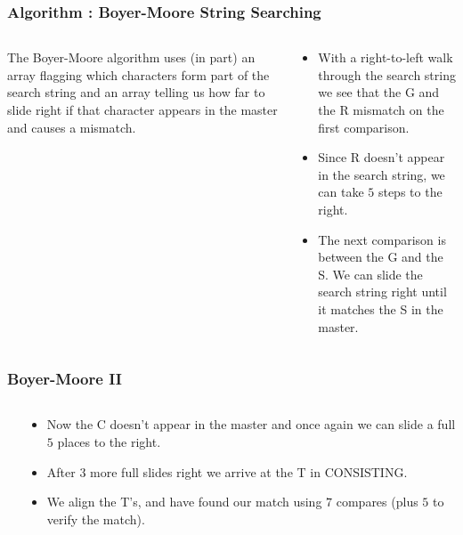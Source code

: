 \begin{frame}[fragile]
\frametitle{Algorithm : Boyer-Moore String Searching}
\begin{columns}[T]

\begin{column}{0.45\textwidth}
The Boyer-Moore algorithm uses (in part) an array flagging
which characters form part of the search string and an array telling
us how far to slide right if that character appears in the master and causes
a mismatch.

\end{column}

\pause
\begin{column}{0.45\textwidth}
\begin{itemize}[<+->]
\item With a right-to-left walk through the search string we see that the G and the R mismatch on the first comparison.
\item Since R doesn't appear in the
search string, we can take $5$ steps to the right.
\item The next comparison is between the G and the S. We can slide the search string right until it matches the S in the master.
\end{itemize}
\end{column}

\end{columns}
\end{frame}


\begin{frame}[fragile]
\frametitle{Boyer-Moore II}
\begin{columns}[T]

\begin{column}{0.45\textwidth}
\end{column}

\begin{column}{0.45\textwidth}
\begin{itemize}[<+->]
\item Now the C doesn't appear in the master and once again we can slide a full $5$ places to the right.
\item After $3$ more full slides right we arrive at the T in CONSISTING.
\item We align the T's, and have found our match using $7$ compares (plus $5$ to verify the match).
\end{itemize}
\end{column}

\end{columns}
\end{frame}
















